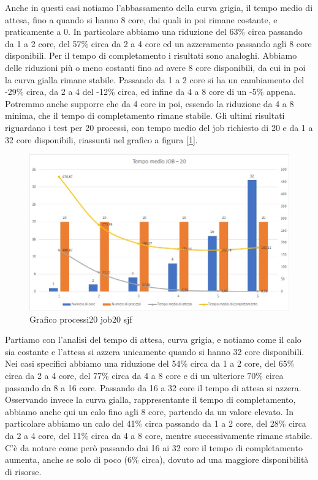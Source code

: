 \documentclass[Lau, oneside]{sapthesis}%
\begin{document}
Anche in questi casi notiamo l'abbassamento della curva grigia, il tempo medio di attesa, fino a quando si hanno 8 core, dai quali in poi rimane costante, e praticamente a 0.
In particolare abbiamo una riduzione del 63\% circa passando da 1 a 2 core, del 57\% circa da 2 a 4 core ed un azzeramento passando agli 8 core disponibili.
Per il tempo di completamento i risultati sono analoghi.
Abbiamo delle riduzioni più o meno costanti fino ad avere 8 core disponibili, da cui in poi la curva gialla rimane stabile.
Passando da 1 a 2 core si ha un cambiamento del -29\% circa, da 2 a 4 del -12\% circa, ed infine da 4 a 8 core di un -5\% appena.
Potremmo anche supporre che da 4 core in poi, essendo la riduzione da 4 a 8 minima, che il tempo di completamento rimane stabile.
Gli ultimi risultati riguardano i test per 20 processi, con tempo medio del job richiesto di 20 e da 1 a 32 core disponibili, riassunti nel grafico a figura \hyperref[figura:p20j20sjf]{[\ref*{figura:p20j20sjf}]}.
\begin{figure}[ht!]
  \centering
  \includegraphics[width=1\textwidth]{Grafico processi20 job20 sjf.jpg}
  \caption{Grafico processi20 job20 sjf}
  \label{figura:p20j20sjf}
\end{figure}
Partiamo con l'analisi del tempo di attesa, curva grigia, e notiamo come il calo sia costante e l'attesa si azzera unicamente quando si hanno 32 core disponibili.
Nei casi specifici abbiamo una riduzione del 54\% circa da 1 a 2 core, del 65\% circa da 2 a 4 core, del 77\% circa da 4 a 8 core e di un ulteriore 70\% circa passando da 8 a 16 core.
Passando da 16 a 32 core il tempo di attesa si azzera.
Osservando invece la curva gialla, rappresentante il tempo di completamento, abbiamo anche qui un calo fino agli 8 core, partendo da un valore elevato.
In particolare abbiamo un calo del 41\% circa passando da 1 a 2 core, del 28\% circa da 2 a 4 core, del 11\% circa da 4 a 8 core, mentre successivamente rimane stabile.
C'è da notare come però passando dai 16 ai 32 core il tempo di completamento aumenta, anche se solo di poco (6\% circa), dovuto ad una maggiore disponibilità di risorse.
\end{document}
